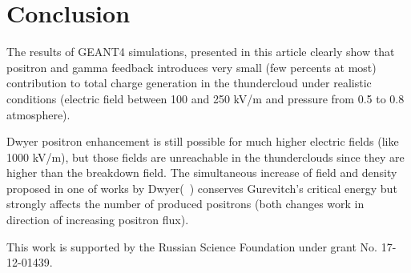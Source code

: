 \documentclass[utf8]{webofc}
\begin{document}
    \section{Conclusion}
    
    The results of GEANT4 simulations, presented in this article clearly show that positron and gamma feedback introduces very small (few percents at most) contribution to total charge generation in the thundercloud under realistic conditions (electric field between 100 and 250 kV/m and pressure from 0.5 to 0.8 atmosphere). 
    
    Dwyer positron enhancement is still possible for much higher electric fields (like 1000 kV/m), but those fields are unreachable in the thunderclouds since they are higher than the breakdown field. The simultaneous increase of field and density proposed in one of works by Dwyer(~\cite{dwyer2003fundamental}) conserves Gurevitch's critical energy but strongly affects the number of produced positrons (both changes work in direction of increasing positron flux).
    
    
    This work is supported by the Russian Science Foundation under grant No. 17-12-01439.
    
    {}
\end{document}
